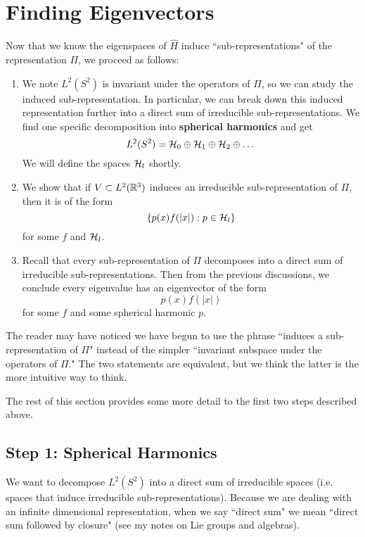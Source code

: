 \section{Finding Eigenvectors}
Now that we know the eigenspaces of $\hat{H}$ induce ``sub-representations" of the representation $\Pi$, we proceed as follows:
\begin{enumerate}
    \item We note $L^2(S^2)$ is invariant under the operators of $\Pi$, so we can study the induced sub-representation. In particular, we can break down this induced representation further into a direct sum of irreducible sub-representations. We find one specific decomposition into \textbf{spherical harmonics} and get
        \[
            L^2(S^2) = {\mathcal H}_0 \oplus {\mathcal H}_1 \oplus {\mathcal H}_2 \oplus \dots
        \]
        We will define the spaces ${\mathcal H}_l$ shortly.

    \item We show that if $V \subset L^2({\mathbb R}^3)$ induces an irreducible sub-representation of $\Pi$, then it is of the form
        \[
            \{p(x)f(|x|): p \in {\mathcal H}_l\}
        \]
        for some $f$ and ${\mathcal H}_l$.

    \item Recall that every sub-representation of $\Pi$ decomposes into a direct sum of irreducible sub-representations. Then from the previous discussions, we conclude every eigenvalue has an eigenvector of the form
        \[
            p(x)f(|x|)
        \]
        for some $f$ and some spherical harmonic $p$.
\end{enumerate}
The reader may have noticed we have begun to use the phrase ``induces a sub-representation of $\Pi$" instead of the simpler ``invariant subspace under the operators of $\Pi$." The two statements are equivalent, but we think the latter is the more intuitive way to think.

The rest of this section provides some more detail to the first two steps described above.

\subsection{Step 1: Spherical Harmonics}
We want to decompose $L^2(S^2)$ into a direct sum of irreducible spaces (i.e. spaces that induce irreducible sub-representations). Because we are dealing with an infinite dimensional representation, when we say ``direct sum" we mean ``direct sum followed by closure" (see my notes on Lie groups and algebras).

